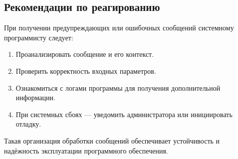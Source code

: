 \subsection{Рекомендации по реагированию}

При получении предупреждающих или ошибочных сообщений системному программисту следует:

\begin{enumerate}
  \item Проанализировать сообщение и его контекст.
  \item Проверить корректность входных параметров.
  \item Ознакомиться с логами программы для получения дополнительной информации.
  \item При системных сбоях — уведомить администратора или инициировать отладку.
\end{enumerate}

Такая организация обработки сообщений обеспечивает устойчивость и надёжность эксплуатации программного обеспечения.
